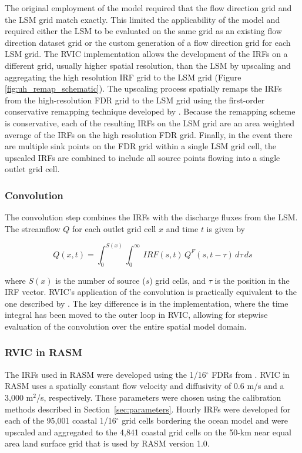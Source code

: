 \documentclass[jgrga, draft]{agutex}
\begin{document}
\begin{article}
\begin{itemize}[leftmargin=+.5in]
\begin{itemize}[leftmargin=+.5in]
The original employment of the \citet{Lohmann_1996} model required that the flow direction grid and the LSM grid match exactly.
This limited the applicability of the model and required either the LSM to be evaluated on the same grid as an existing flow direction dataset grid or the custom generation of a flow direction grid for each LSM grid.
The RVIC implementation allows the development of the IRFs on a different grid, usually higher spatial resolution, than the LSM by upscaling and aggregating the high resolution IRF grid to the LSM grid (Figure \ref{fig:uh_remap_schematic}).
The upscaling process spatially remaps the IRFs from the high-resolution FDR grid to the LSM grid using the first-order conservative remapping technique developed by \citet{Jones_1999}.
Because the remapping scheme is conservative, each of the resulting IRFs on the LSM grid are an area weighted average of the IRFs on the high resolution FDR grid.
Finally, in the event there are multiple sink points on the FDR grid within a single LSM grid cell, the upscaled IRFs are combined to include all source points flowing into a single outlet grid cell.

\subsubsection{Convolution}
\label{sec:convolution}

The convolution step combines the IRFs with the discharge fluxes from the LSM.
The streamflow $Q$ for each outlet grid cell $x$ and time $t$ is given by

\begin{equation}
  \label{eq:convolution}
   Q(x,t) = \int_0^{S(x)} \int_0^{\infty}\,IRF(s,t)\,Q^F(s,t-\tau)\,d\tau\,ds
 \end{equation}

where $S(x)$ is the number of source ($s$) grid cells, and $\tau$ is the position in the IRF vector.
RVIC's application of the convolution is practically equivalent to the one described by \citet{Lohmann_1996}.
The key difference is in the implementation, where the time integral has been moved to the outer loop in RVIC, allowing for stepwise evaluation of the convolution over the entire spatial model domain.

\subsubsection{RVIC in RASM}

The IRFs used in RASM were developed using the 1/16$^{\circ}$ FDRs from \citet{Wu_2011}.
RVIC in RASM uses a spatially constant flow velocity and diffusivity of 0.6 m/s and a 3,000 m$^2$/s, respectively.
These parameters were chosen using the calibration methods described in Section~\ref{sec:parameters}.
Hourly IRFs were developed for each of the 95,001 coastal 1/16$^{\circ}$ grid cells bordering the ocean model and were upscaled and aggregated to the 4,841 coastal grid cells on the 50-km near equal area land surface grid that is used by RASM version 1.0.


\end{itemize}
\end{itemize}
\end{article}
\end{document}
